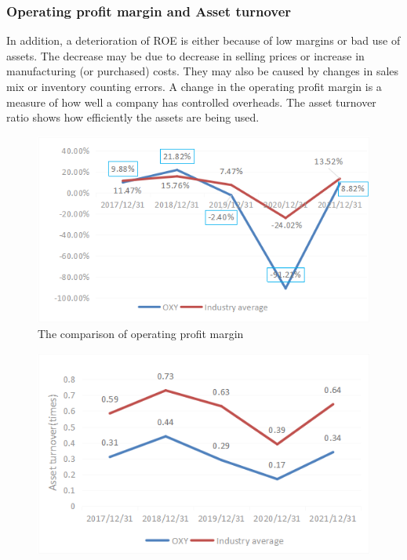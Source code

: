 \documentclass[
	a4paper, %
	12pt,%
]{CSSullivanBusinessReport}
\begin{document}
\begin{fullwidth}
\subsubsection{Operating profit margin and Asset turnover}
In addition, a deterioration of ROE is either because of low margins or bad use of assets. The decrease may be due to decrease in selling prices or increase in manufacturing (or purchased) costs. They may also be caused by changes in sales mix or inventory counting errors. A change in the operating profit margin is a measure of how well a company has controlled overheads. The asset turnover ratio shows how efficiently the assets are being used. 
\begin{figure}[h]
    \centering
    \includegraphics[width=15cm]{Images/The comparison of operating profit margin.png}
    \caption{ The comparison of operating profit margin}
    \label{ The comparison of operating profit margin}
\end{figure}
\begin{figure}[h]
    \centering
    \includegraphics[width=15cm]{Images/The comparison of asset turnover.png}

\end{figure}
\end{fullwidth}
\end{document}
